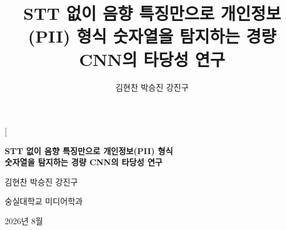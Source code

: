 \documentclass[10pt,twocolumn]{article}
\title{STT 없이 음향 특징만으로 개인정보(PII) 형식 숫자열을 탐지하는 경량 CNN의 타당성 연구}
\author{김현찬 \quad 박승진 \quad 강진구}
\date{}
\begin{document}
\twocolumn[%
\begin{center}
{\LARGE\bfseries STT 없이 음향 특징만으로 개인정보(PII) 형식\\[2pt]
숫자열을 탐지하는 경량 CNN의 타당성 연구\par}
\vspace{4mm}
{\large 김현찬 \quad 박승진 \quad 강진구\par}
\vspace{1.5mm}
{\normalsize 숭실대학교 미디어학과\par}
\vspace{1mm}
{\small 2026년 8월\par}
\end{center}
\vspace{3mm}
\end{document}
